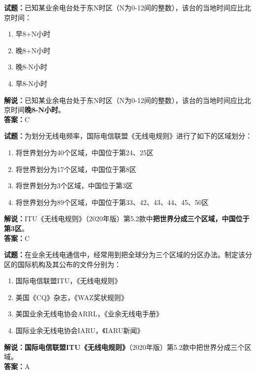 \documentclass{ctexbook}
\begin{document}
\bigskip


\noindent\textbf{试题：}已知某业余电台处于东N时区（N为0-12间的整数），该台的当地时间应比北京时间：
\begin{enumerate}[leftmargin=3em]
\item 早8+N小时
\item 晚8+N小时
\item 晚8-N小时
\item 早8-N小时
\end{enumerate}
\noindent\textbf{解说：}已知某业余电台处于东N时区（N为0-12间的整数），该台的当地时间应比北京时间\textbf{晚8-N小时}。\\\noindent\textbf{答案：}C



\bigskip


\noindent\textbf{试题：}为划分无线电频率，国际电信联盟《无线电规则》进行了如下的区域划分：
\begin{enumerate}[leftmargin=3em]
\item 将世界划分为40个区域，中国位于第24、25区
\item 将世界划分为17个区域，中国位于第8区
\item 将世界划分为3个区域，中国位于第3区
\item 将世界划分为89个区域，中国位于第33、42、43、44、45、50区
\end{enumerate}
\noindent\textbf{解说：}ITU《无线电规则》（2020年版）第5.2款中\textbf{把世界分成三个区域，中国位于第3区}。\\\noindent\textbf{答案：}C



\bigskip


\noindent\textbf{试题：}在业余无线电通信中，经常用到把全球分为三个区域的分区办法。制定该分区的国际机构及其公布的文件分别为：
\begin{enumerate}[leftmargin=3em]
\item 国际电信联盟ITU，《无线电规则》
\item 美国《CQ》杂志，《WAZ奖状规则》
\item 美国业余无线电协会ARRL，《业余无线电手册》
\item 国际业余无线电协会IARU，《IARU新闻》
\end{enumerate}
\noindent\textbf{解说：}\textbf{国际电信联盟ITU《无线电规则》}（2020年版）第5.2款中把世界分成三个区域。\\\noindent\textbf{答案：}A




\bigskip
\end{document}
